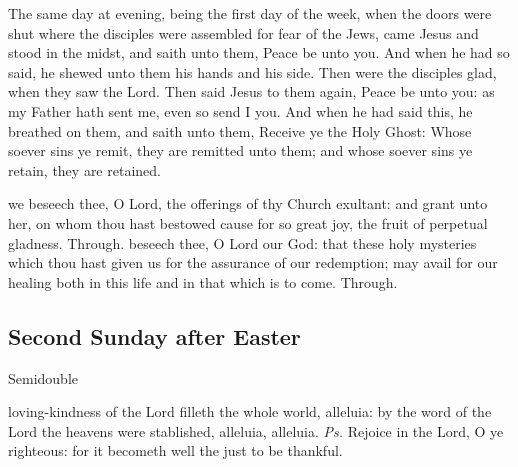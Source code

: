  The same day at evening, being the first day of the week, when the doors were shut where the disciples were assembled for fear of the Jews, came Jesus and stood in the midst, and saith unto them, Peace be unto you. And when he had so said, he shewed unto them his hands and his side. Then were the disciples glad, when they saw the Lord. Then said Jesus to them again, Peace be unto you: as my Father hath sent me, even so send I you. And when he had said this, he breathed on them, and saith unto them, Receive ye the Holy Ghost: Whose soever sins ye remit, they are remitted unto them; and whose soever sins ye retain, they are retained.

\secret
{} we beseech thee, O Lord, the offerings of thy Church exultant: and grant unto her, on whom thou hast bestowed cause for so great joy, the fruit of perpetual gladness. Through.
\postcommunion
{} beseech thee, O Lord our God: that these holy mysteries which thou hast given us for the assurance of our redemption; may avail for our healing both in this life and in that which is to come. Through.

\subsection{Second Sunday after Easter}\label{EasterII}
\begin{inhead}
    {Semidouble}
\end{inhead}


\introit
{} loving-kindness of the Lord filleth the whole world, alleluia: by the word of the Lord the heavens were stablished, alleluia, alleluia. \textit{Ps.} Rejoice in the Lord, O ye righteous: for it becometh well the just to be thankful.

